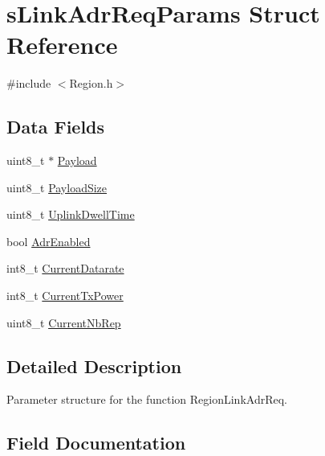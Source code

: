 \hypertarget{structsLinkAdrReqParams}{}\section{s\+Link\+Adr\+Req\+Params Struct Reference}
\label{structsLinkAdrReqParams}


{\ttfamily \#include $<$Region.\+h$>$}

\subsection*{Data Fields}
\begin{DoxyCompactItemize}
\item 
uint8\+\_\+t $\ast$ \hyperlink{structsLinkAdrReqParams_ad4d35a1161753bb4006dfd00efd04270}{Payload}
\item 
uint8\+\_\+t \hyperlink{structsLinkAdrReqParams_ae12d8663597aa0cf1134ac00f77238c4}{Payload\+Size}
\item 
uint8\+\_\+t \hyperlink{structsLinkAdrReqParams_a4e183e8eb34bdc875c1d746a37985ac1}{Uplink\+Dwell\+Time}
\item 
bool \hyperlink{structsLinkAdrReqParams_abb00ae40cef849998af4c833c3811136}{Adr\+Enabled}
\item 
int8\+\_\+t \hyperlink{structsLinkAdrReqParams_a41048b1ea55a4acf361fbea7535c9ffe}{Current\+Datarate}
\item 
int8\+\_\+t \hyperlink{structsLinkAdrReqParams_ac23ec953d7e409b28938bfdc01a2d2a8}{Current\+Tx\+Power}
\item 
uint8\+\_\+t \hyperlink{structsLinkAdrReqParams_acdca5949f614789437af421720461a47}{Current\+Nb\+Rep}
\end{DoxyCompactItemize}


\subsection{Detailed Description}
Parameter structure for the function Region\+Link\+Adr\+Req. 

\subsection{Field Documentation}
\mbox{\label{structsLinkAdrReqParams_abb00ae40cef849998af4c833c3811136}} 
